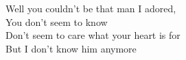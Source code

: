 Well you couldn't be that man I adored, \\
You don't seem to know \\
Don't seem to care what your heart is for \\
But I don't know him anymore \\

